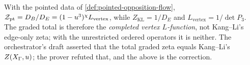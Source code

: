 \begin{theorem}
\label{thm:total-zeta-vertex-l}
With the pointed data of \cref{def:pointed-opposition-flow},
$\mathcal Z_{\mathrm{pt}} = D_B/D_E = (1-u^3)^{\chi}L_{\mathrm{vertex}}$, while
$Z_{\mathrm{KL}} = 1/D_E$ and $L_{\mathrm{vertex}} = 1/\det P_3$. The graded
total is therefore the \emph{completed vertex $L$-function}, not Kang--Li's
edge-only zeta; with the unrestricted ordered operators it is neither. The
orchestrator's draft asserted that the total graded zeta equals Kang--Li's
$Z(X_\Gamma,u)$; the prover refuted that, and the above is the correction.
\end{theorem}
